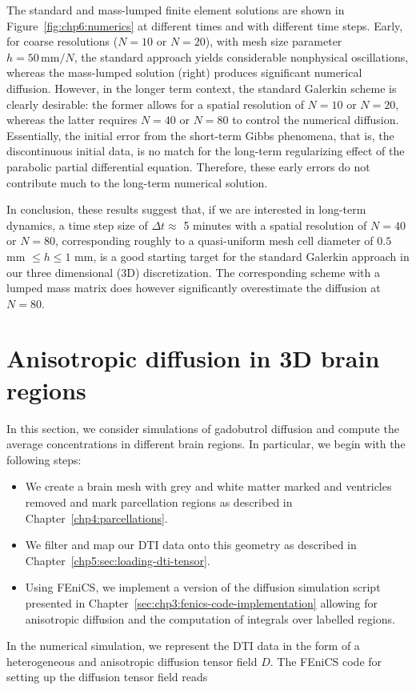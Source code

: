 The standard and mass-lumped finite element solutions are shown in
Figure~\ref{fig:chp6:numerics} at different times and with different
time steps. Early, for coarse resolutions ($N = 10$ or $N=20$), with mesh size parameter $h=50 \, \mbox{mm}/N$,  the
standard approach yields considerable nonphysical oscillations, whereas 
the mass-lumped solution (right) produces significant numerical
diffusion. However, in the longer term context, the standard Galerkin
scheme is clearly desirable: the former allows for a spatial
resolution of $N=10$ or $N=20$, whereas the latter requires $N=40$ or
$N=80$ to control the numerical diffusion. Essentially, the initial
error from the short-term Gibbs phenomena, that is, the discontinuous
initial data, is no match for the long-term regularizing effect of the
parabolic partial differential equation. Therefore, these early errors do not contribute much to the
long-term numerical solution.

In conclusion, these results suggest that, if we are interested in
long-term dynamics, a time step size of $\Delta t \approx$ 5 minutes with
a spatial resolution of $N=40$ or $N=80$, corresponding roughly to a
quasi-uniform mesh cell diameter of $0.5$ mm $\leq h \leq 1$ mm, is
a good starting target for the standard Galerkin approach in our three dimensional 
(3D) discretization. The corresponding scheme with a lumped mass matrix does however
significantly overestimate the diffusion at $N=80$. 

\section{Anisotropic diffusion in 3D brain regions}

In this section, we consider simulations of gadobutrol diffusion 
and compute the average concentrations in different brain regions. In
particular, we begin with the following steps:
\begin{itemize}
\item
  We create a brain mesh with grey and white matter marked and
  ventricles removed and mark parcellation regions as described in
  Chapter~\ref{chp4:parcellations}. 
\item
  We filter and map our DTI data onto this geometry as described in 
  Chapter~\ref{chp5:sec:loading-dti-tensor}.
\item
  Using FEniCS, we implement a version of the diffusion simulation
  script presented in
  Chapter~\ref{sec:chp3:fenics-code-implementation} allowing for
  anisotropic diffusion and the computation of integrals over labelled
  regions.
\end{itemize}
In the numerical simulation, we represent the DTI data in the form of
a heterogeneous and anisotropic diffusion tensor field $D$. The FEniCS
code for setting up the diffusion tensor field reads 

